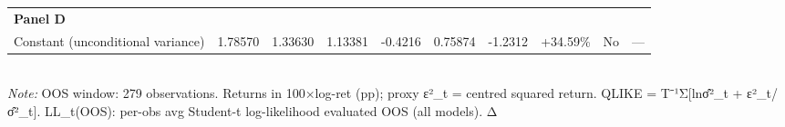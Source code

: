 \begin{table}[ht]
\begin{tabular}{lrrrrrrrrr}
\multicolumn{10}{l}{\textbf{Panel D}} \\
Constant (unconditional variance) & 1.78570 & 1.33630 & 1.13381 & -0.4216 & 0.75874 & -1.2312 & +34.59\% & No & — \\
\bottomrule
\end{tabular}
\\[3pt]\footnotesize\textit{Note:} OOS window: 279 observations. Returns in 100×log-ret (pp); proxy ε²_t = centred squared return. QLIKE = T⁻¹Σ[lnσ̂²_t + ε²_t/σ̂²_t]. LL_t(OOS): per-obs avg Student-t log-likelihood evaluated OOS (all models). Δ%
\end{table}